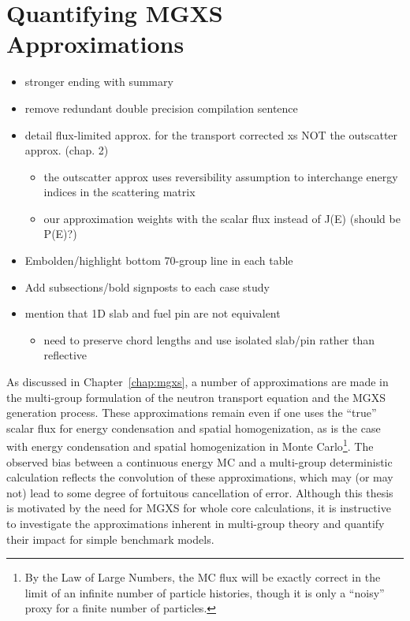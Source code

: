 \chapter{Quantifying MGXS Approximations}
\label{chap:biases}

\begin{itemize}[noitemsep]
  \item stronger ending with summary
  \item remove redundant double precision compilation sentence
  \item detail flux-limited approx. for the transport corrected xs NOT the outscatter approx. (chap. 2)
  \begin{itemize}[noitemsep]
    \item the outscatter approx uses reversibility assumption to interchange energy indices in the scattering matrix
    \item our approximation weights with the scalar flux instead of J(E) (should be P(E)?)
  \end{itemize}
  \item Embolden/highlight bottom 70-group line in each table
  \item Add subsections/bold signposts to each case study
  \item mention that 1D slab and fuel pin are not equivalent
  \begin{itemize}
    \item need to preserve chord lengths and use isolated slab/pin rather than reflective
  \end{itemize}
\end{itemize}

As discussed in Chapter~\ref{chap:mgxs}, a number of approximations are made in the multi-group formulation of the neutron transport equation and the \ac{MGXS} generation process. These approximations remain even if one uses the ``true'' scalar flux for energy condensation and spatial homogenization, as is the case with energy condensation and spatial homogenization in Monte Carlo\footnote{By the Law of Large Numbers, the \ac{MC} flux will be exactly correct in the limit of an infinite number of particle histories, though it is only a ``noisy'' proxy for a finite number of particles.}. The observed bias between a continuous energy \ac{MC} and a multi-group deterministic calculation reflects the convolution of these approximations, which may (or may not) lead to some degree of fortuitous cancellation of error. Although this thesis is motivated by the need for \ac{MGXS} for whole core calculations, it is instructive to investigate the approximations inherent in multi-group theory and quantify their impact for simple benchmark models.

